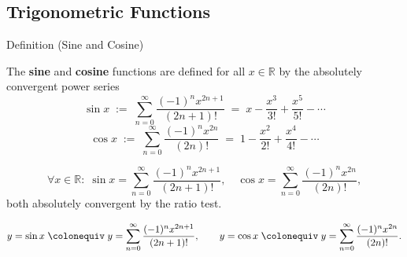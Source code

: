 
\subsection*{Trigonometric Functions}
\label{sec:trigonometric}

\begin{definitionbox}{Definition (Sine and Cosine)}
\begin{definition}
\label{def:sine-cosine}
The \textbf{sine} and \textbf{cosine} functions are defined for all
$x \in \mathbb{R}$ by the absolutely convergent power series
\[
  \sin x \;:=\;
  \sum_{n=0}^{\infty} \frac{(-1)^n x^{2n+1}}{(2n+1)!}
  \;=\; x - \frac{x^3}{3!} + \frac{x^5}{5!} - \cdots
\]
\[
  \cos x \;:=\;
  \sum_{n=0}^{\infty} \frac{(-1)^n x^{2n}}{(2n)!}
  \;=\; 1 - \frac{x^2}{2!} + \frac{x^4}{4!} - \cdots
\]
\end{definition}
\end{definitionbox}

\begin{remark*}
\[
  \forall x \in \mathbb{R} :\;
  \sin x = \sum_{n=0}^\infty \frac{(-1)^n x^{2n+1}}{(2n+1)!},
  \quad
  \cos x = \sum_{n=0}^\infty \frac{(-1)^n x^{2n}}{(2n)!},
\]
both absolutely convergent by the ratio test.
\end{remark*}

\begin{remark*}
\[
  y=\sin x
  \;\colonequiv\;
  y = \sum_{n=0}^\infty \frac{(-1)^n x^{2n+1}}{(2n+1)!},
  \qquad
  y=\cos x
  \;\colonequiv\;
  y = \sum_{n=0}^\infty \frac{(-1)^n x^{2n}}{(2n)!}.
\]
\end{remark*}

